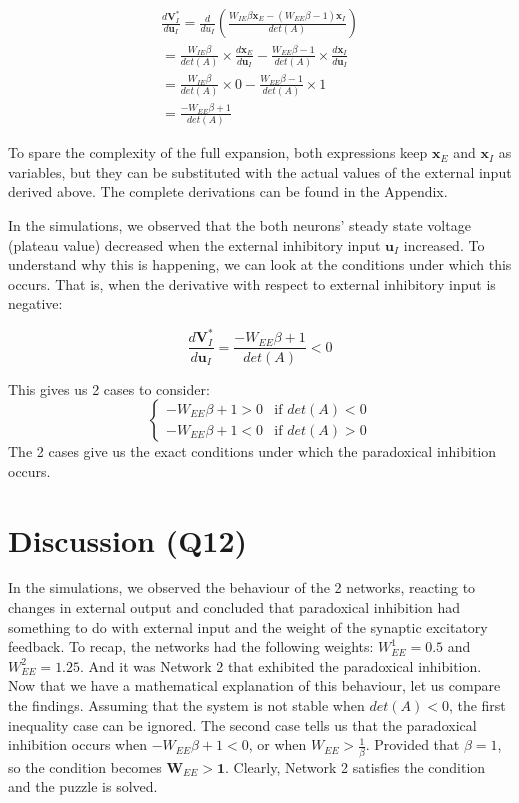 \documentclass[10pt,twocolumn]{article}
\begin{document}
$$
    \begin{gathered}
        \frac{d\textbf{V}^\ast_I}{d\textbf{u}_I}
        = \frac{d}{du_I}\left(\frac{W_{IE}\beta \textbf{x}_E - (W_{EE}\beta - 1) \textbf{x}_I}{det(A)}\right)\\
        = \frac{W_{IE}\beta}{det(A)}\times\frac{d\textbf{x}_E}{d\textbf{u}_I} 
        - \frac{W_{EE}\beta - 1}{det(A)}\times\frac{d\textbf{x}_I}{d\textbf{u}_I}\\
        = \frac{W_{IE}\beta}{det(A)}\times 0 
        - \frac{W_{EE}\beta - 1}{det(A)}\times 1\\ 
        = \boxed{\frac{-W_{EE}\beta + 1}{det(A)}}
    \end{gathered}
$$

To spare the complexity of the full expansion, both expressions keep 
$\textbf{x}_E$ and $\textbf{x}_I$ as variables, but they can be 
substituted with the actual values of the external input
derived above. The complete derivations can be found in the Appendix.

In the simulations, we observed that the both neurons' steady state
voltage (plateau value) decreased when the external inhibitory input $\textbf{u}_I$ increased.
To understand why this is happening, we can look at the conditions
under which this occurs. That is, when the derivative with respect to
external inhibitory input is negative:

$$
    \frac{d\textbf{V}^\ast_I}{d\textbf{u}_I}=\frac{-W_{EE}\beta + 1}{det(A)} < 0
$$

This gives us 2 cases to consider:
$$
    \begin{cases}
        -W_{EE}\beta + 1 > 0 & \text{if } det(A) < 0 \\
        -W_{EE}\beta + 1 < 0 & \text{if } det(A) > 0
    \end{cases}
$$
The 2 cases give us the exact conditions under which the paradoxical inhibition occurs.

\section{Discussion (Q12)}
In the simulations, we observed the behaviour of the 2 networks,
reacting to changes in external output and concluded that 
paradoxical inhibition had something to do with external input
and the weight of the synaptic excitatory feedback. 
To recap, the networks had the following weights: $W^1_{EE} = 0.5$ and $W^2_{EE} = 1.25$.
And it was Network 2 that exhibited the paradoxical inhibition.
Now that we have a mathematical explanation of this behaviour, let us 
compare the findings. Assuming that the system is not stable when $det(A) < 0$, 
the first inequality case can be ignored. The second case tells us that
the paradoxical inhibition occurs when $-W_{EE}\beta + 1 < 0$,
or when $W_{EE} > \frac{1}{\beta}$. Provided that $\beta = 1$, so
the condition becomes $\textbf{W}_{EE} > \textbf{1}$.
Clearly, Network 2 satisfies the condition and the puzzle is solved.
\end{document}
